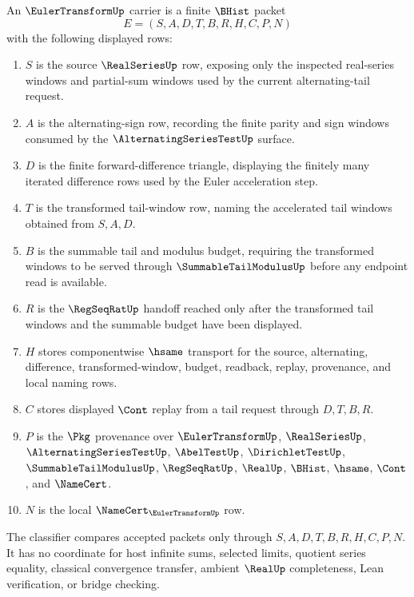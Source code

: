 \begin{definition}\label{def:euler-transform-carrier}
An $\EulerTransformUp$ carrier is a finite $\BHist$ packet
$$
E=(S,A,D,T,B,R,H,C,P,N)
$$
with the following displayed rows:
\begin{enumerate}
\item $S$ is the source $\RealSeriesUp$ row, exposing only the inspected real-series windows and partial-sum windows used by the current alternating-tail request.
\item $A$ is the alternating-sign row, recording the finite parity and sign windows consumed by the $\AlternatingSeriesTestUp$ surface.
\item $D$ is the finite forward-difference triangle, displaying the finitely many iterated difference rows used by the Euler acceleration step.
\item $T$ is the transformed tail-window row, naming the accelerated tail windows obtained from $S,A,D$.
\item $B$ is the summable tail and modulus budget, requiring the transformed windows to be served through $\SummableTailModulusUp$ before any endpoint read is available.
\item $R$ is the $\RegSeqRatUp$ handoff reached only after the transformed tail windows and the summable budget have been displayed.
\item $H$ stores componentwise $\hsame$ transport for the source, alternating, difference, transformed-window, budget, readback, replay, provenance, and local naming rows.
\item $C$ stores displayed $\Cont$ replay from a tail request through $D,T,B,R$.
\item $P$ is the $\Pkg$ provenance over $\EulerTransformUp$, $\RealSeriesUp$, $\AlternatingSeriesTestUp$, $\AbelTestUp$, $\DirichletTestUp$, $\SummableTailModulusUp$, $\RegSeqRatUp$, $\RealUp$, $\BHist$, $\hsame$, $\Cont$, and $\NameCert$.
\item $N$ is the local $\NameCert_{\EulerTransformUp}$ row.
\end{enumerate}
The classifier compares accepted packets only through $S,A,D,T,B,R,H,C,P,N$. It has no coordinate for host infinite sums, selected limits, quotient series equality, classical convergence transfer, ambient $\RealUp$ completeness, Lean verification, or bridge checking.
\end{definition}

